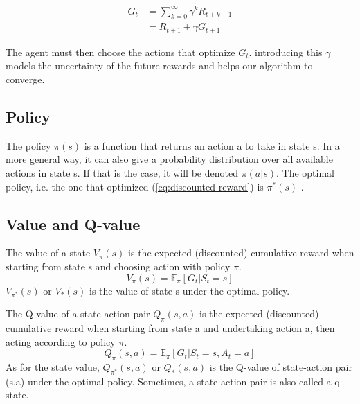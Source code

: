 \begin{align} \label{eq:discounted reward}
    G_t &= \sum _{k=0}^\infty \gamma ^k R_ {t+k+1}\\
        &= R_{t+1} + \gamma G_{t+1}
\end{align}

The agent must then choose the actions that optimize $G_t$. introducing this $\gamma$ models the uncertainty of the future rewards and helps our algorithm to converge. 

\subsection{Policy}

The policy $\pi(s)$  is a function that returns an action a to take in state s. In a more general way, it can also give a probability distribution over all available actions in state s. If that is the case, it will be denoted $\pi(a|s)$. The optimal policy, i.e. the one that optimized (\ref{eq:discounted reward}) is $\pi^*(s)$ .

\subsection{Value and Q-value}\label{sec:value}

The value of a state $V_\pi(s)$  is the expected (discounted) cumulative reward when starting from state s and choosing action with policy $\pi$. 
\begin{equation} \label{eq:value}
    V_\pi(s) = \mathbb{E}_{\pi}[G_t|S_t=s]
\end{equation}
$V_{\pi^*}(s)$ or $V_*(s)$ is the value of state s under the optimal policy.\\ 


The Q-value of a state-action pair $Q_\pi(s,a)$  is the expected (discounted) cumulative reward when starting from state a and undertaking action a, then acting according to policy $\pi$.
\begin{equation} \label{eq:q-value}
    Q_\pi(s,a) = \mathbb{E}_{\pi}[G_t|S_t=s,A_t=a]
\end{equation}
As for the state value, $Q_{\pi^*}(s,a)$ or $Q_*(s,a)$ is the Q-value of state-action pair (s,a) under the optimal policy. Sometimes, a state-action pair is also called a q-state.\\ 

